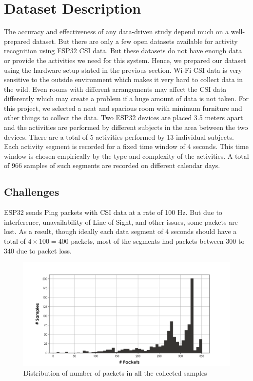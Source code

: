 \section{Dataset Description}
The accuracy and effectiveness of any data-driven study depend much on a well-prepared dataset. But there are only a few open datasets available for activity recognition using ESP32 CSI data. But these datasets do not have enough data or provide the activities we need for this system. Hence, we prepared our dataset using the hardware setup stated in the previous section. Wi-Fi CSI data is very sensitive to the outside environment which makes it very hard to collect data in the wild. Even rooms with different arrangements may affect the CSI data differently which may create a problem if a huge amount of data is not taken. For this project, we selected a neat and spacious room with minimum furniture and other things to collect the data. Two ESP32 devices are placed 3.5 meters apart and the activities are performed by different subjects in the area between the two devices. There are a total of 5 activities performed by 13 individual subjects. Each activity segment is recorded for a fixed time window of 4 seconds. This time window is chosen empirically by the type and complexity of the activities. A total of 966 samples of such segments are recorded on different calendar days.

\subsection{Challenges}
ESP32 sends Ping packets with CSI data at a rate of 100 Hz. But due to interference, unavailability of Line of Sight, and other issues, some packets are lost. As a result, though ideally each data segment of 4 seconds should have a total of $ 4 \times 100 = 400$ packets, most of the segments had packets between 300 to 340 due to packet loss.

\begin{figure}[H]
\centering
\includegraphics[width=1.0\textwidth]{./figure/chap 4/all_data_sizes.png}
\caption{Distribution of number of packets in all the collected samples}
\label{Fig 4.6}
\end{figure}

